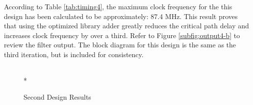 According to Table \ref{tab:timing4}, the maximum clock frequency for the this design has been calculated to be approximately: 87.4 MHz. This result proves that using the optimized library adder greatly reduces the critical path delay and increases clock frequency by over a third. Refer to Figure \ref{subfig:output4-b} to review the filter output. The block diagram for this design is the same as the third iteration, but is included for consistency. 

\begin{figure}[htp]
  \begin{center}
     \\*
  \end{center}
  \caption{Second Design Results}
  \label{fig:design4_results}
\end{figure}